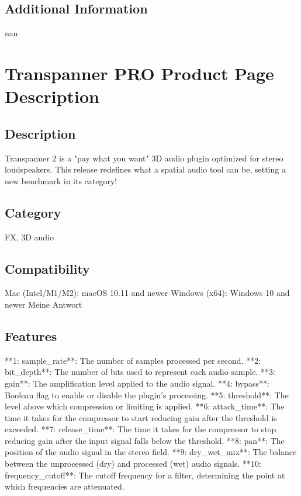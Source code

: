\documentclass[8pt]{article}
\begin{document}
{{{{    \subsection*{Additional Information}
    nan
    

    \section*{Transpanner PRO  Product Page Description}

    \subsection*{Description}
    Transpanner 2 is a "pay what you want" 3D audio plugin optimized for stereo loudspeakers. This release redefines what a spatial audio tool can be, setting a new benchmark in its category!

    \subsection*{Category}
    FX, 3D audio

    \subsection*{Compatibility}
    Mac (Intel/M1/M2): macOS 10.11 and newer
Windows (x64): Windows 10 and newer
Meine Antwort


    \subsection*{Features}
    **1: sample_rate**: The number of samples processed per second.
**2: bit_depth**: The number of bits used to represent each audio sample.
**3: gain**: The amplification level applied to the audio signal.
**4: bypass**: Boolean flag to enable or disable the plugin’s processing.
**5: threshold**: The level above which compression or limiting is applied.
**6: attack_time**: The time it takes for the compressor to start reducing gain after the threshold is exceeded.
**7: release_time**: The time it takes for the compressor to stop reducing gain after the input signal falls below the threshold.
**8: pan**: The position of the audio signal in the stereo field.
**9: dry_wet_mix**: The balance between the unprocessed (dry) and processed (wet) audio signals.
**10: frequency_cutoff**: The cutoff frequency for a filter, determining the point at which frequencies are attenuated.

}}}}
\end{document}
